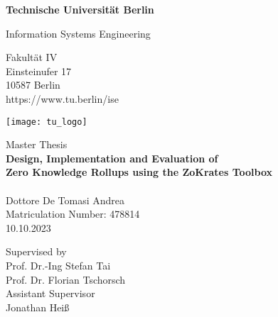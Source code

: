 \thispagestyle{empty}
\begin{center}

\vspace*{1cm}
{\LARGE \textbf{Technische Universität Berlin}}

\vspace{0.5cm}

{\large Information Systems Engineering\\[1mm]}

Fakultät IV\\
Einsteinufer 17\\
10587 Berlin\\
https://www.tu.berlin/ise\\

\vspace*{1cm}

\texttt{[image: tu\_logo]}

\vspace*{1.0cm}

{\LARGE Master Thesis}\\

\vspace{1.0cm}
{\LARGE \textbf{Design, Implementation and Evaluation of}}\\
\vspace*{0.2cm}
{\LARGE \textbf{Zero Knowledge Rollups using the ZoKrates Toolbox}}\\
\vspace*{0.2cm}
{\LARGE \textbf{}}\\
\vspace*{1.0cm}
{\LARGE Dottore De Tomasi Andrea}
\\
\vspace*{0.5cm}
Matriculation Number: 478814\\
10.10.2023\\ %
\vspace*{1.2cm}

Supervised by\\
Prof. Dr.-Ing Stefan Tai\\
Prof. Dr. Florian Tschorsch\\
\vspace*{0.2cm}
Assistant Supervisor\\
Jonathan Heiß
\end{center}
